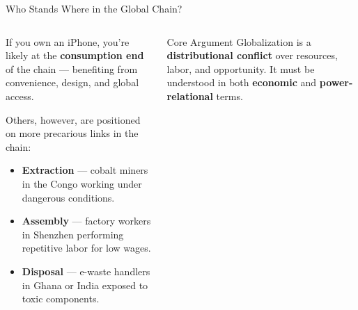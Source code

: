 \documentclass{beamer}
\begin{document}
\begin{frame}{Who Stands Where in the Global Chain?}

\small
\begin{columns}[T,onlytextwidth]

    \begin{column}{0.65\textwidth}
        If you own an iPhone, you're likely at the \textbf{consumption end} of the chain — benefiting from convenience, design, and global access.

        Others, however, are positioned on more precarious links in the chain:

        \begin{itemize}
            \item \textbf{Extraction} — cobalt miners in the Congo working under dangerous conditions.
            \item \textbf{Assembly} — factory workers in Shenzhen performing repetitive labor for low wages.
            \item \textbf{Disposal} — e-waste handlers in Ghana or India exposed to toxic components.
        \end{itemize}
    \end{column}

    \begin{column}{0.35\textwidth}
        \begin{block}{Core Argument}
        Globalization is a \textbf{distributional conflict} over resources, labor, and opportunity.  
        It must be understood in both \textbf{economic} and \textbf{power-relational} terms.
        \end{block}
    \end{column}

\end{columns}
\end{frame}
\end{document}
